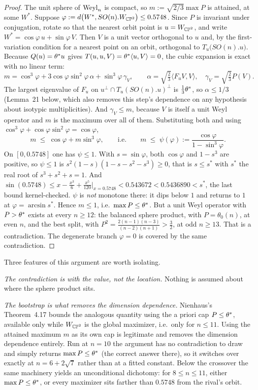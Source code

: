 \begin{proof}
The unit sphere of $\mathrm{Weyl}_n$ is compact, so $m:=\sqrt{2/3}\max P$ is attained, at some $W^{*}$. Suppose $\varphi:=d\big(W^{*},SO(n).W_{\mathbb{CP}^2}\big)\le0.5748$. Since $P$ is invariant under conjugation, rotate so that the nearest orbit point is $u=W_{\mathbb{CP}^2}$, and write $W^{*}=\cos\varphi\,u+\sin\varphi\,V$. Then $V$ is a unit vector orthogonal to $u$ and, by the first-variation condition for a nearest point on an orbit, orthogonal to $T_u\big(SO(n).u\big)$. Because $Q(u)=\theta^{*} u$ gives $T(u,u,V)=\theta^{*}\langle u,V\rangle=0$, the cubic expansion is exact with no linear term:
\[
m=\cos^3\varphi+3\cos\varphi\sin^2\varphi\,\alpha+\sin^3\varphi\,\gamma_V,\qquad
\alpha=\sqrt{\tfrac23}\langle F_uV,V\rangle,\quad \gamma_V=\sqrt{\tfrac23}P(V).
\]
The largest eigenvalue of $F_u$ on $u^\perp\cap T_u(SO(n).u)^\perp$ is $\tfrac13\theta^{*}$, so $\alpha\le1/3$ (Lemma~21 below, which also removes this step's dependence on any hypothesis about isotypic multiplicities). And $\gamma_V\le m$, because $V$ is itself a unit Weyl operator and $m$ is the maximum over all of them. Substituting both and using $\cos^3\varphi+\cos\varphi\sin^2\varphi=\cos\varphi$,
\[
m\;\le\;\cos\varphi+m\sin^3\varphi,\qquad\text{i.e.}\qquad m\;\le\;\psi(\varphi):=\frac{\cos\varphi}{1-\sin^3\varphi}.
\]
On $[0,0.5748]$ one has $\psi\le1$. With $s=\sin\varphi$, both $\cos\varphi$ and $1-s^3$ are positive, so $\psi\le1$ is $s^2(1-s)(1-s-s^2-s^3)\ge0$, that is $s\le s^*$ with $s^*$ the real root of $s^3+s^2+s=1$. And $\sin(0.5748)\le x-\tfrac{x^3}6+\tfrac{x^5}{120}\big|_{x=0.5748}<0.543672<0.5436890<s^*$, the last bound kernel-checked. $\psi$ is \emph{not} monotone there: it dips below $1$ and returns to $1$ at $\varphi=\arcsin s^*$. Hence $m\le1$, i.e.\ $\max P\le\theta^{*}$. But a unit Weyl operator with $P>\theta^{*}$ exists at every $n\ge12$: the balanced sphere product, with $P=\theta_0(n)$, at even $n$, and the best split, with $P^2=\frac{2(n-1)(n-3)}{(n-2)(n+1)}>\tfrac32$, at odd $n\ge13$. That is a contradiction. The degenerate branch $\varphi=0$ is covered by the same contradiction.
\end{proof}

Three features of this argument are worth isolating.

\emph{The contradiction is with the value, not the location.} Nothing is assumed about where the sphere product sits.

\emph{The bootstrap is what removes the dimension dependence.} Nienhaus's Theorem~4.17 bounds the analogous quantity using the a priori cap $P\le\theta^{*}$, available only while $W_{\mathbb{CP}^2}$ is the global maximizer, i.e.\ only for $n\le11$. Using the attained maximum $m$ as its own cap is legitimate and removes the dimension dependence entirely. Run at $n=10$ the argument has no contradiction to draw and simply returns $\max P\le\theta^{*}$ (the correct answer there), so it switches over exactly at $n=6+2\sqrt7$ rather than at a fitted constant. Below the crossover the same machinery yields an unconditional dichotomy: for $8\le n\le11$, either $\max P\le\theta^{*}$, or every maximizer sits farther than $0.5748$ from the rival's orbit.

